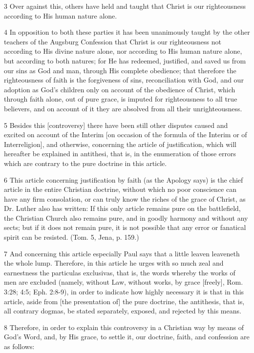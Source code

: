3 Over against this, others have held and taught that Christ is our righteousness according to His human nature alone.

4 In opposition to both these parties it has been unanimously taught by the other teachers of the Augsburg Confession that Christ is our righteousness not according to His divine nature alone, nor according to His human nature alone, but according to both natures; for He has redeemed, justified, and saved us from our sins as God and man, through His complete obedience; that therefore the righteousness of faith is the forgiveness of sins, reconciliation with God, and our adoption as God’s children only on account of the obedience of Christ, which through faith alone, out of pure grace, is imputed for righteousness to all true believers, and on account of it they are absolved from all their unrighteousness.

5 Besides this [controversy] there have been still other disputes caused and excited on account of the Interim [on occasion of the formula of the Interim or of Interreligion], and otherwise, concerning the article of justification, which will hereafter be explained in antithesi, that is, in the enumeration of those errors which are contrary to the pure doctrine in this article.

6 This article concerning justification by faith (as the Apology says) is the chief article in the entire Christian doctrine, without which no poor conscience can have any firm consolation, or can truly know the riches of the grace of Christ, as Dr. Luther also has written: If this only article remains pure on the battlefield, the Christian Church also remains pure, and in goodly harmony and without any sects; but if it does not remain pure, it is not possible that any error or fanatical spirit can be resisted. (Tom. 5, Jena, p. 159.)

7 And concerning this article especially Paul says that a little leaven leaveneth the whole lump. Therefore, in this article he urges with so much zeal and earnestness the particulas exclusivas, that is, the words whereby the works of men are excluded (namely, without Law, without works, by grace [freely], Rom. 3:28; 4:5; Eph. 2:8-9), in order to indicate how highly necessary it is that in this article, aside from [the presentation of] the pure doctrine, the antithesis, that is, all contrary dogmas, be stated separately, exposed, and rejected by this means.

8 Therefore, in order to explain this controversy in a Christian way by means of God’s Word, and, by His grace, to settle it, our doctrine, faith, and confession are as follows:

